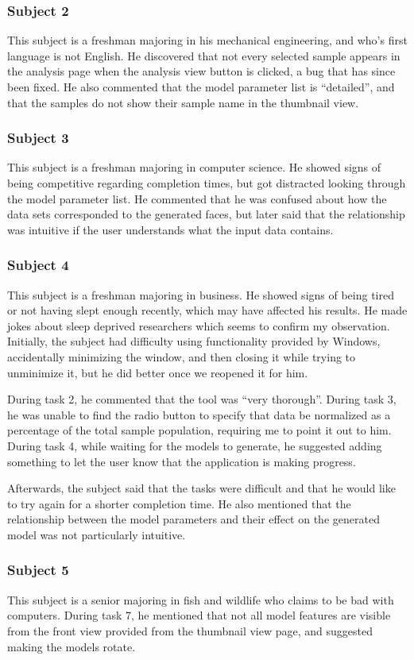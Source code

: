 \documentclass[letterpaper,10pt, onecolumn, draftclsnofoot]{IEEEtran}
\begin{document}
\subsubsection{Subject 2}
This subject is a freshman majoring in his mechanical engineering, and who's first language is not English. He discovered that not every selected sample appears in the analysis page when the analysis view button is clicked, a bug that has since been fixed. He also commented that the model parameter list is ``detailed'', and that the samples do not show their sample name in the thumbnail view.

\subsubsection{Subject 3}
This subject is a freshman majoring in computer science. He showed signs of being competitive regarding completion times, but got distracted looking through the model parameter list. He commented that he was confused about how the data sets corresponded to the generated faces, but later said that the relationship was intuitive if the user understands what the input data contains.

\subsubsection{Subject 4}
This subject is a freshman majoring in business. He showed signs of being tired or not having slept enough recently, which may have affected his results. He made jokes about sleep deprived researchers which seems to confirm my observation. Initially, the subject had difficulty using functionality provided by Windows, accidentally minimizing the window, and then closing it while trying to unminimize it, but he did better once we reopened it for him. 

During task 2, he commented that the tool was ``very thorough''. During task 3, he was unable to find the radio button to specify that data be normalized as a percentage of the total sample population, requiring me to point it out to him. During task 4, while waiting for the models to generate, he suggested adding something to let the user know that the application is making progress.

Afterwards, the subject said that the tasks were difficult and that he would like to try again for a shorter completion time. He also mentioned that the relationship between the model parameters and their effect on the generated model was not particularly intuitive.

\subsubsection{Subject 5}
This subject is a senior majoring in fish and wildlife who claims to be bad with computers. During task 7, he mentioned that not all model features are visible from the front view provided from the thumbnail view page, and suggested making the models rotate.
\end{document}
